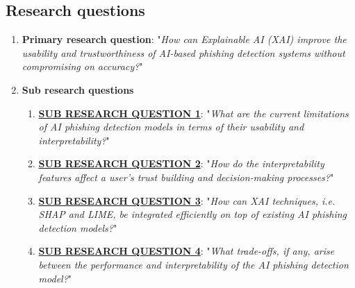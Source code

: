 
\subsection{Research questions}

\begin{enumerate}
  \item \textbf{Primary research question}: "\textit{How can Explainable AI (XAI) improve the usability and trustworthiness of AI-based phishing detection systems without compromising on accuracy?}"
  \item \textbf{Sub research questions}
    \begin{enumerate}
      \item \uline{\textbf{SUB RESEARCH QUESTION 1}}: "\textit{What are the current limitations of AI phishing detection models in terms of their usability and interpretability?}"\label{sub-research-q1}
      \item \uline{\textbf{SUB RESEARCH QUESTION 2}}: "\textit{How do the interpretability features affect a user's trust building and decision-making processes?}"\label{sub-research-q2}
      \item \uline{\textbf{SUB RESEARCH QUESTION 3}}: "\textit{How can XAI techniques, i.e. SHAP and LIME, be integrated efficiently on top of existing AI phishing detection models?}"\label{sub-research-q3}
      \item \uline{\textbf{SUB RESEARCH QUESTION 4}}: "\textit{What trade-offs, if any, arise between the performance and interpretability of the AI phishing detection model?}"\label{sub-research-q4}
    \end{enumerate}
\end{enumerate}
